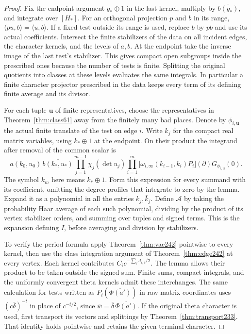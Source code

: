 \documentclass[a4paper,11pt]{article}
\theoremstyle{definition}
\theoremstyle{remark}
\numberwithin{equation}{section}
\begin{document}
\begin{proof}
Fix the endpoint argument \(g_*\oplus1\) in the last kernel,
multiply by \(\overline{b(g_*)}\), and integrate over \([H_*]\).
For an orthogonal projection \(p\) and \(b\) in its range,
\(\langle p u,b\rangle=\langle u,b\rangle\).
If a fixed test outside its range is used, replace \(b\) by
\(p b\) and use its actual coefficients. Intersect the finite
stabilizers of the data on all incident edges, the character
kernels, and the levels of \(a,b\). At the endpoint take the
inverse image of the last test's stabilizer. This gives compact
open subgroups inside the prescribed ones because the number of
tests is finite. Splitting the original quotients into classes
at these levels evaluates the same integrals. In particular a
finite character projector prescribed in the data keeps every
term of its defining finite average and its divisor.

For each tuple \(\mathbf u\) of finite representatives, choose
the representatives in Theorem~\ref{thm:class61} away from the
finitely many bad places. Denote by \(\phi_{i,\mathbf u}\)
the actual finite translate of the test on edge \(i\). Write
\(k_j\) for the compact real matrix variables, using \(k_*\oplus1\)
at the endpoint. On their product the integrand after removal of the common scalar is
\[
 a(k_0,u_0)\,\overline{b(k_*,u_*)}
 \prod_{j=1}^{m-1}\chi_j(\det u_j)
 \prod_{i=1}^m
   \bigl[\omega_{i,\infty}(k_{i-1},k_i)P_i\bigr](\partial)
                                 G_{\phi_{i,\mathbf u}}(0).
\]
The symbol \(k_m\) here means \(k_*\oplus1\).
Form this expression for every summand with its coefficient,
omitting the degree profiles that integrate to zero by the
lemma. Expand it as a polynomial in all the entries \(k_j,\bar k_j\).
Define \(\mathcal A\) by taking the probability Haar average
of each such polynomial, dividing by the product of its vertex
stabilizer orders, and summing over tuples and signed terms.
This is the expansion defining \(I\), before averaging and
division by stabilizers.

To verify the period formula apply Theorem~\ref{thm:vac242}
pointwise to every kernel, then use the class integration
argument of Theorem~\ref{thm:edge242} at every vertex. Each
kernel contributes \(C_i c^{-\sum_\tau d_{i,\tau}/2}\). The
lemma allows their product to be taken outside the signed sum.
Finite sums, compact integrals, and the uniformly convergent
theta kernels admit these interchanges. The same calculation
for tests written as \(P_i(\overline{\Phi(a')})\) in raw
matrix coordinates uses \((c\bar\delta)^{-t}\) in place of
\(c^{-t/2}\), since \(\bar w=\bar\delta\,\overline{\Phi(a')}\).
If the original theta character is used, first transport its
vectors and splittings by Theorem~\ref{thm:transport233}. That
identity holds pointwise and retains the given terminal character.


\end{proof}
\end{document}
